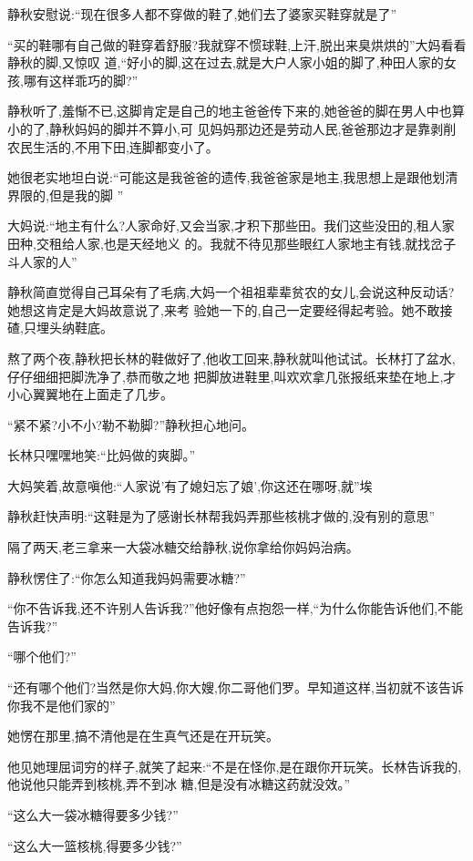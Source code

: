 ﻿\documentclass[12pt]{article}
\begin{document}
静秋安慰说:``现在很多人都不穿做的鞋了,她们去了婆家买鞋穿就是了\myrule ''

``买的鞋哪有自己做的鞋穿着舒服?我就穿不惯球鞋,上汗,脱出来臭烘烘的\myrule ''大妈看看静秋的脚,又惊叹
道,``好小的脚,这在过去,就是大户人家小姐的脚了,种田人家的女孩,哪有这样乖巧的脚?''

静秋听了,羞惭不已,这脚肯定是自己的地主爸爸传下来的,她爸爸的脚在男人中也算小的了,静秋妈妈的脚并不算小,可
见妈妈那边还是劳动人民,爸爸那边才是靠剥削农民生活的,不用下田,连脚都变小了。

她很老实地坦白说:``可能这是我爸爸的遗传,我爸爸\myrule 家是地主,我思想上是跟他划清界限的,但是我的脚
\myrule ''

大妈说:``地主有什么?人家命好,又会当家,才积下那些田。我们这些没田的,租人家田种,交租给人家,也是天经地义
的。我就不待见那些眼红人家地主有钱,就找岔子斗人家的人\myrule ''

静秋简直觉得自己耳朵有了毛病,大妈一个祖祖辈辈贫农的女儿,会说这种反动话?她想这肯定是大妈故意说了,来考
验她一下的,自己一定要经得起考验。她不敢接碴,只埋头纳鞋底。

熬了两个夜,静秋把长林的鞋做好了,他收工回来,静秋就叫他试试。长林打了盆水,仔仔细细把脚洗净了,恭而敬之地
把脚放进鞋里,叫欢欢拿几张报纸来垫在地上,才小心翼翼地在上面走了几步。

``紧不紧?小不小?勒不勒脚?''静秋担心地问。

长林只嘿嘿地笑:``比妈做的\myrule 爽脚。''

大妈笑着,故意嗔他:``人家说'有了媳妇忘了娘',你这还在哪呀,就\myrule ''埃

静秋赶快声明:``这鞋是为了感谢长林帮我妈弄那些核桃才做的,没有别的意思\myrule ''

隔了两天,老三拿来一大袋冰糖交给静秋,说你拿给你妈妈治病。

静秋愣住了:``你怎么\myrule 知道我妈妈\myrule 需要冰糖?''

``你不告诉我,还不许别人告诉我?''他好像有点抱怨一样,``为什么你能告诉他们,不能告诉我?''

``哪个他们?''

``还有哪个他们?当然是你大妈,你大嫂,你二哥他们罗。早知道这样,当初就不该告诉你我不是他们家的\myrule ''

她愣在那里,搞不清他是在生真气还是在开玩笑。

他见她理屈词穷的样子,就笑了起来:``不是在怪你,是在跟你开玩笑。长林告诉我的,他说他只能弄到核桃,弄不到冰
糖,但是没有冰糖这药就没效。''

``这么大一袋冰糖\myrule 得要\myrule 多少钱?''

``这么大一篮核桃,得要多少钱?''
\end{document}
